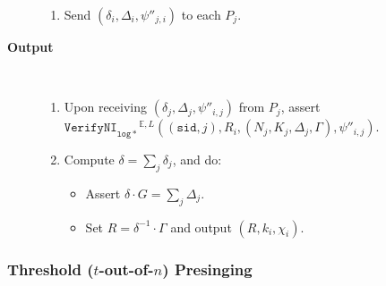 \documentclass[11pt]{article}
\newcommand{\sid}{\ensuremath{\mathtt{sid}}}
\newcommand{\verifyni}[1]{\ensuremath{\mathtt{VerifyNI}_{\mathtt{#1}}}}
\newcommand{\E}{\mathbb{E}}
\newcommand{\?}[1]{\stackrel{?}{#1}}
\begin{document}
\begin{description}
\begin{enumerate}
        \item Send $(\delta_i, \Delta_i, \psi''_{j,i})$ to each $P_j$.
    \end{enumerate}

    \item[\textbf{Output}] \
    \begin{enumerate}
        \item Upon receiving $(\delta_j, \Delta_j, \psi''_{i,j})$ from $P_j$, assert $\verifyni{log*}^{\E,L}((\sid, j), R_i,(N_j, K_j, \Delta_j, \Gamma), \psi''_{i,j})$.

        \item Compute $\delta = \sum_j \delta_j$, and do:
        \begin{itemize}
            \item Assert $\delta \cdot G = \sum_j \Delta_j$. 
            \item Set $R = \delta^{-1} \cdot \Gamma$ and output $(R, k_i, \chi_i)$.
        \end{itemize}
    \end{enumerate}
\end{description}

\subsubsection{Threshold ($t$-out-of-$n$) Presinging}
\end{document}
